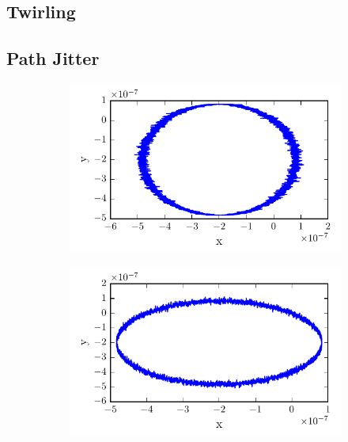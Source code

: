 \subsection{Twirling}

\subsection{Path Jitter}

\begin{figure}[H]
	\centering
	\begin{subfigure}[t]{0.49\textwidth}
		\centering
		\includegraphics[width=\linewidth]{Figures/xjit.pdf}
		\caption{}
		\label{fig:xjit}
	\end{subfigure}
	\begin{subfigure}[t]{0.49\textwidth}
		\centering
		\includegraphics[width=\linewidth]{Figures/yjit.pdf}
		\caption{}
		\label{fig:yjit}
	\end{subfigure}
	\begin{subfigure}[t]{0.49\textwidth}

\end{subfigure}
\end{figure}
